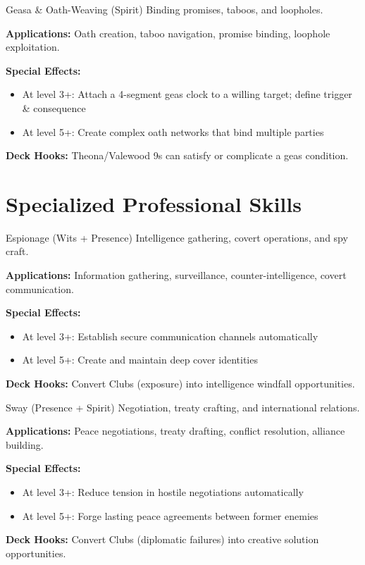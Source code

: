 \documentclass[11pt]{report}
\begin{document}
\begin{skillbox}{Geasa \& Oath-Weaving (Spirit)}
Binding promises, taboos, and loopholes.

\textbf{Applications:} Oath creation, taboo navigation, promise binding, loophole exploitation.

\textbf{Special Effects:}
\begin{itemize}
    \item At level 3+: Attach a 4-segment geas clock to a willing target; define trigger \& consequence
    \item At level 5+: Create complex oath networks that bind multiple parties
\end{itemize}

\textbf{Deck Hooks:} Theona/Valewood 9s can satisfy or complicate a geas condition.
\end{skillbox}

\section{Specialized Professional Skills}

\begin{skillbox}{Espionage (Wits + Presence)}
Intelligence gathering, covert operations, and spy craft.

\textbf{Applications:} Information gathering, surveillance, counter-intelligence, covert communication.

\textbf{Special Effects:}
\begin{itemize}
    \item At level 3+: Establish secure communication channels automatically
    \item At level 5+: Create and maintain deep cover identities
\end{itemize}

\textbf{Deck Hooks:} Convert Clubs (exposure) into intelligence windfall opportunities.
\end{skillbox}

\begin{skillbox}{Sway (Presence + Spirit)}
Negotiation, treaty crafting, and international relations.

\textbf{Applications:} Peace negotiations, treaty drafting, conflict resolution, alliance building.

\textbf{Special Effects:}
\begin{itemize}
    \item At level 3+: Reduce tension in hostile negotiations automatically
    \item At level 5+: Forge lasting peace agreements between former enemies
\end{itemize}

\textbf{Deck Hooks:} Convert Clubs (diplomatic failures) into creative solution opportunities.
\end{skillbox}
\end{document}
